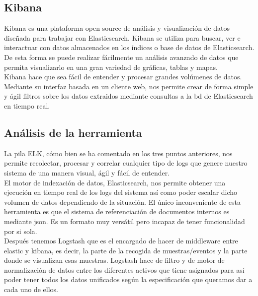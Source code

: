 \subsection{Kibana}
Kibana es una plataforma open-source de análisis y visualización de datos diseñada para trabajar con Elasticsearch. Kibana se utiliza para buscar, ver e interactuar con datos almacenados en los índices o base de datos de Elasticsearch. De esta forma se puede realizar fácilmente un análisis avanzado de datos que permita visualizarlo en una gran variedad de gráficas, tablas y mapas.\\

Kibana hace que sea fácil de entender y procesar grandes volúmenes de datos. Mediante su interfaz basada en un cliente web, nos permite crear de forma simple y ágil filtros sobre los datos extraidos mediante consultas a la bd de Elasticsearch en tiempo real.\\


\subsection{Análisis de la herramienta}

La pila ELK, cómo bien se ha comentado en los tres puntos anteriores, nos permite recolectar, procesar y correlar cualquier tipo de logs que genere nuestro sistema de una manera visual, ágil y fácil de entender. \\

El motor de indexación de datos, Elasticsearch, nos permite obtener una ejecución en tiempo real de los logs del sistema así como poder escalar dicho volumen de datos dependiendo de la situación. El único inconveniente de esta herramienta es que el sistema de referenciación de documentos internos es mediante json. Es un formato muy versátil pero incapaz de tener funcionalidad por si sola.\\

Después tenemos Logstash que es el encargado de hacer de middleware entre elastic y kibana, es decir, la parte de la recogida de muestras/eventos y la parte donde se visualizan esas muestras. Logstash hace de filtro y de motor de normalización de datos entre los diferentes activos que tiene asignados para así poder tener todos los datos unificados según la especificación que queramos dar a cada uno de ellos. \\

